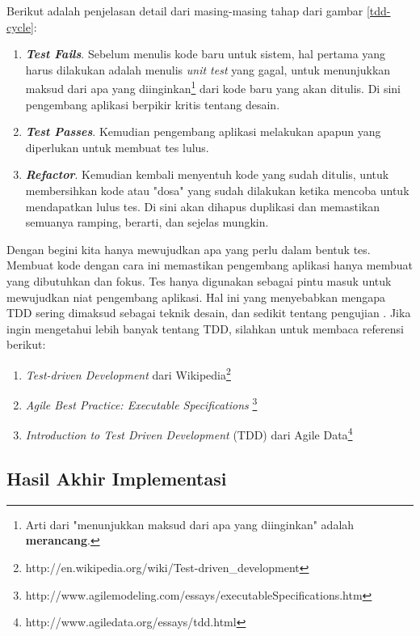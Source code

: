 \documentclass[a4paper, 12pt, oneside]{report}
\begin{document}
\onehalfspacing Berikut adalah penjelasan detail dari masing-masing tahap dari gambar \ref{tdd-cycle}:

\begin{enumerate}
  \item \textbf{\textit{Test Fails}}. Sebelum menulis kode baru untuk sistem, hal pertama yang harus dilakukan adalah menulis \textit{unit test} yang gagal, untuk menunjukkan maksud dari apa yang diinginkan\footnote{Arti dari "menunjukkan maksud dari apa yang diinginkan" adalah \textbf{merancang}.} dari kode baru yang akan ditulis. Di sini pengembang aplikasi berpikir kritis tentang desain.
  \item \textbf{\textit{Test Passes}}. Kemudian pengembang aplikasi melakukan apapun yang diperlukan untuk membuat tes lulus.
  \item \textbf{\textit{Refactor}}. Kemudian kembali menyentuh kode yang sudah ditulis, untuk membersihkan kode atau "dosa" yang sudah dilakukan ketika mencoba untuk mendapatkan lulus tes. Di sini akan dihapus duplikasi dan memastikan semuanya ramping, berarti, dan sejelas mungkin.
\end{enumerate}

\onehalfspacing Dengan begini kita hanya mewujudkan apa yang perlu dalam bentuk tes. Membuat kode dengan cara ini memastikan pengembang aplikasi hanya membuat yang dibutuhkan dan fokus. Tes hanya digunakan sebagai pintu masuk untuk mewujudkan niat pengembang aplikasi. Hal ini yang menyebabkan mengapa TDD sering dimaksud sebagai teknik desain, dan sedikit tentang pengujian \cite{agile-samurai}. Jika ingin mengetahui lebih banyak tentang TDD, silahkan untuk membaca referensi berikut:

\begin{enumerate}
  \item \textit{Test-driven Development} dari Wikipedia\footnote{http://en.wikipedia.org/wiki/Test-driven\_development}
  \item \textit{Agile Best Practice: Executable Specifications} \footnote{http://www.agilemodeling.com/essays/executableSpecifications.htm}
  \item \textit{Introduction to Test Driven Development} (TDD) dari Agile Data\footnote{http://www.agiledata.org/essays/tdd.html}
\end{enumerate}

\subsection{Hasil Akhir Implementasi}
\end{document}

